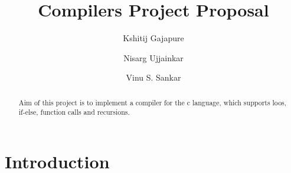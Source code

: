 \documentclass{clv3}
\author{Kshitij Gajapure}
\affil{16110055}
\author{Nisarg Ujjainkar}
\affil{16110102}
\author{Vinu S. Sankar}
\affil{16110xxx}
\title{Compilers Project Proposal}
\begin{document}
    \maketitle  
    \begin{abstract}
        Aim of this project is to implement a compiler for the 
        c language, which supports loos, if-else, function calls 
        and recursions.
    \end{abstract}
    \section{Introduction}
    
\end{document}
